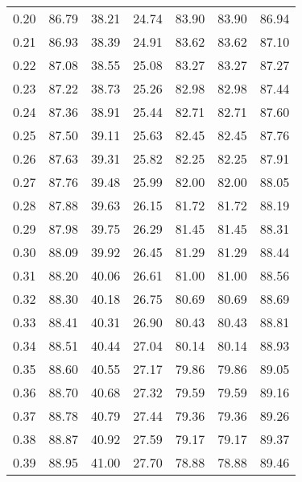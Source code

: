\begin{tabular}{|c|c|c|c|c|c|c|}
      0.20 &     86.79 &     38.21 &      24.74 &   83.90 &      83.90 &         86.94 \\
      0.21 &     86.93 &     38.39 &      24.91 &   83.62 &      83.62 &         87.10 \\
      0.22 &     87.08 &     38.55 &      25.08 &   83.27 &      83.27 &         87.27 \\
      0.23 &     87.22 &     38.73 &      25.26 &   82.98 &      82.98 &         87.44 \\
      0.24 &     87.36 &     38.91 &      25.44 &   82.71 &      82.71 &         87.60 \\
      0.25 &     87.50 &     39.11 &      25.63 &   82.45 &      82.45 &         87.76 \\
      0.26 &     87.63 &     39.31 &      25.82 &   82.25 &      82.25 &         87.91 \\
      0.27 &     87.76 &     39.48 &      25.99 &   82.00 &      82.00 &         88.05 \\
      0.28 &     87.88 &     39.63 &      26.15 &   81.72 &      81.72 &         88.19 \\
      0.29 &     87.98 &     39.75 &      26.29 &   81.45 &      81.45 &         88.31 \\
      0.30 &     88.09 &     39.92 &      26.45 &   81.29 &      81.29 &         88.44 \\
      0.31 &     88.20 &     40.06 &      26.61 &   81.00 &      81.00 &         88.56 \\
      0.32 &     88.30 &     40.18 &      26.75 &   80.69 &      80.69 &         88.69 \\
      0.33 &     88.41 &     40.31 &      26.90 &   80.43 &      80.43 &         88.81 \\
      0.34 &     88.51 &     40.44 &      27.04 &   80.14 &      80.14 &         88.93 \\
      0.35 &     88.60 &     40.55 &      27.17 &   79.86 &      79.86 &         89.05 \\
      0.36 &     88.70 &     40.68 &      27.32 &   79.59 &      79.59 &         89.16 \\
      0.37 &     88.78 &     40.79 &      27.44 &   79.36 &      79.36 &         89.26 \\
      0.38 &     88.87 &     40.92 &      27.59 &   79.17 &      79.17 &         89.37 \\
      0.39 &     88.95 &     41.00 &      27.70 &   78.88 &      78.88 &         89.46 \\

\end{tabular}
